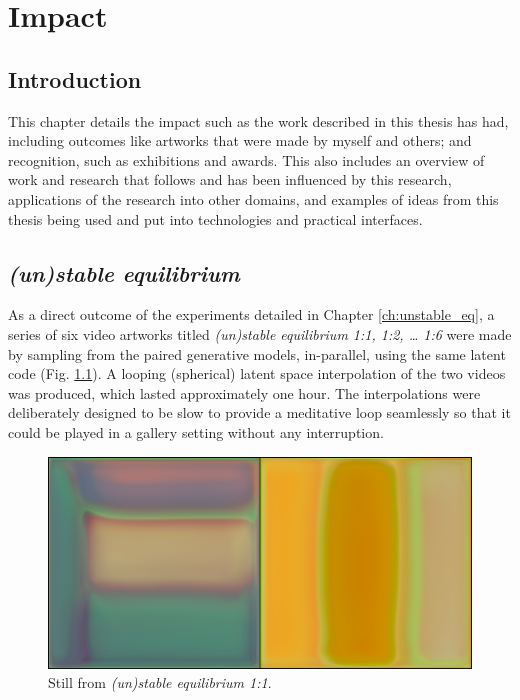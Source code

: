 \chapter{Impact}
\label{ch:impact}

\section{Introduction}

This chapter details the impact such as the work described in this thesis has had, including outcomes like artworks that were made by myself and others; and recognition, such as exhibitions and awards. 
This also includes an overview of work and research that follows and has been influenced by this research, applications of the research into other domains, and examples of ideas from this thesis being used and put into technologies and practical interfaces. 

\section{\textit{(un)stable equilibrium}}
\label{c7:sec:unstable_eq}

As a direct outcome of the experiments detailed in Chapter \ref{ch:unstable_eq}, a series of six video artworks titled \textit{(un)stable equilibrium 1:1, 1:2, … 1:6} were made by sampling from the paired generative models, in-parallel, using the same latent code  (Fig. \ref{fig:c7:ue_still}). 
A looping (spherical) latent space interpolation \citep{white2016sampling} of the two videos was produced, which lasted approximately one hour. 
The interpolations were deliberately designed to be slow to provide a meditative loop seamlessly so that it could be played in a gallery setting without any interruption.

\begin{figure}[!htb]
    \centering
    \captionsetup{justification=centering}
    \includegraphics[width=1\textwidth]{figures/c7_impact/ue_1_1_still.png}
    \caption{Still from \textit{(un)stable equilibrium 1:1}.}
    \label{fig:c7:ue_still}
\end{figure}

